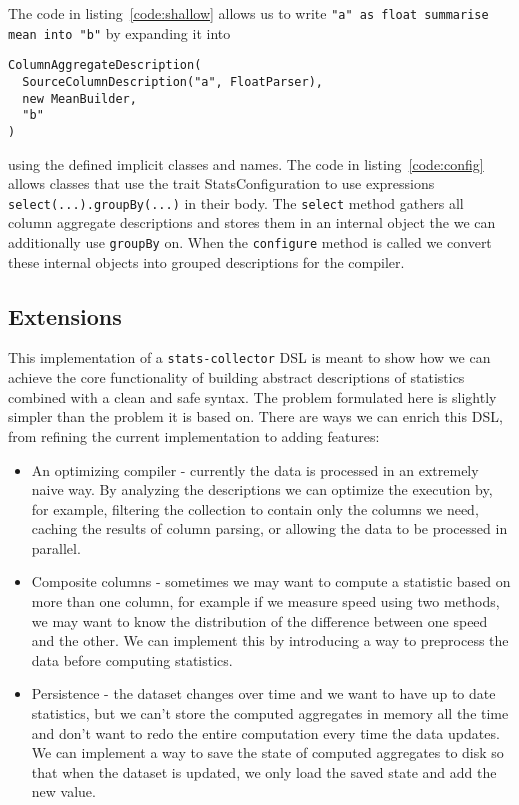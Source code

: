 The code in listing~\ref{code:shallow} allows us to write \texttt{"a" as float summarise mean into "b"} by expanding it into 
\begin{verbatim}
ColumnAggregateDescription(
  SourceColumnDescription("a", FloatParser),
  new MeanBuilder,
  "b"
)
\end{verbatim}
using the defined implicit classes and names.
The code in listing~\ref{code:config} allows classes that use the trait StatsConfiguration to use expressions \texttt{select(...).groupBy(...)} in their body.
The \texttt{select} method gathers all column aggregate descriptions and stores them in an internal object the we can additionally use \texttt{groupBy} on.
When the \texttt{configure} method is called we convert these internal objects into grouped descriptions for the compiler.

\subsection{Extensions}

This implementation of a \texttt{stats-collector} DSL is meant to show how we can achieve the core functionality of building abstract descriptions of statistics combined with a clean and safe syntax.
The problem formulated here is slightly simpler than the problem it is based on.
There are ways we can enrich this DSL, from refining the current implementation to adding features:
\begin{itemize}
	\item An optimizing compiler - currently the data is processed in an extremely naive way.
By analyzing the descriptions we can optimize the execution by, for example, filtering the collection to contain only the columns we need, caching the results of column parsing, or allowing the data to be processed in parallel.
  \item Composite columns - sometimes we may want to compute a statistic based on more than one column, for example if we measure speed using two methods, we may want to know the distribution of the difference between one speed and the other.
We can implement this by introducing a way to preprocess the data before computing statistics.
  \item Persistence - the dataset changes over time and we want to have up to date statistics, but we can't store the computed aggregates in memory all the time and don't want to redo the entire computation every time the data updates.
We can implement a way to save the state of computed aggregates to disk so that when the dataset is updated, we only load the saved state and add the new value.
\end{itemize}


